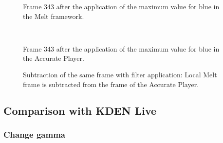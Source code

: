 \documentclass[../MasterThesis.tex]{subfiles}
\begin{document}
\begin{minipage}{0.48\textwidth}
	
	\begin{figure}[H]
		\begin{center}
			\caption[]{\small Frame 343 after the application of the maximum value for blue in the Melt framework.}
		\end{center}
	\end{figure}
\end{minipage}\begin{minipage}{0.04\textwidth}
	\ 
\end{minipage}\begin{minipage}{0.48\textwidth}
	
	\begin{figure}[H]
		\begin{center}
			\caption[]{\small Frame 343 after the application of the maximum value for blue in the Accurate Player.}
		\end{center}
	\end{figure}
\end{minipage}

\vspace*{-1em}

\begin{figure}[H]
	\begin{center}
		\caption[]{\small Subtraction of the same frame with filter application: Local Melt frame is subtracted from the frame of the Accurate Player.}
	\end{center}
\end{figure}















\subsection*{Comparison with KDEN Live}

\vspace*{-0.4em}

\subsubsection*{Change gamma}
\end{document}
